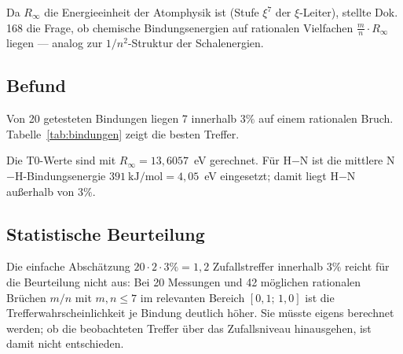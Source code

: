 Da $R_\infty$ die Energieeinheit der Atomphysik ist (Stufe $\xi^7$ der
$\xi$-Leiter), stellte Dok.\,168 die Frage, ob chemische Bindungsenergien
auf rationalen Vielfachen $\frac{m}{n} \cdot R_\infty$ liegen — analog zur
$1/n^2$-Struktur der Schalenergien.

\subsection{Befund}
\label{subsec:befund-be}

Von 20 getesteten Bindungen liegen 7 innerhalb $3\%$ auf einem rationalen Bruch.
Tabelle~\ref{tab:bindungen} zeigt die besten Treffer.

\begin{table}[htbp]
\centering
\caption{Bindungsenergien auf rationalen Vielfachen von $R_\infty$ (NIST-Werte)}
\label{tab:bindungen}
\end{table}
Die T0-Werte sind mit $R_\infty = 13{,}6057$~eV gerechnet. Für H$-$N ist die mittlere N$-$H-Bindungsenergie $391~\text{kJ/mol} = 4{,}05$~eV eingesetzt; damit liegt H$-$N außerhalb von $3\%$.

\subsection{Statistische Beurteilung}
\label{subsec:statistik-be}

Die einfache Abschätzung $20 \cdot 2 \cdot 3\% = 1{,}2$ Zufallstreffer innerhalb $3\%$
reicht für die Beurteilung nicht aus: Bei 20 Messungen und 42 möglichen
rationalen Brüchen $m/n$ mit $m,n \leq 7$ im relevanten Bereich $[0{,}1;\, 1{,}0]$
ist die Trefferwahrscheinlichkeit je Bindung deutlich höher. Sie müsste eigens
berechnet werden; ob die beobachteten Treffer über das Zufallsniveau
hinausgehen, ist damit nicht entschieden.

